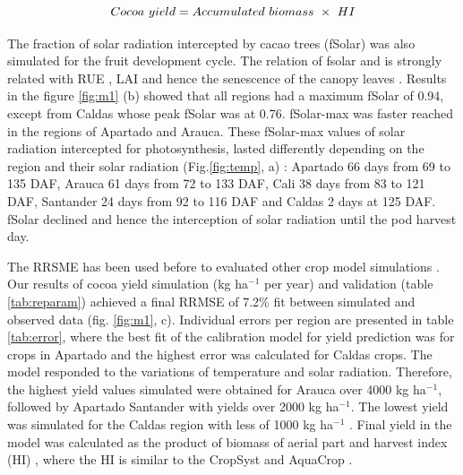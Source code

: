 \documentclass[gene,journal,article,submit,moreauthors,pdftex]{Definitions/mdpi}
\begin{document}
\begin{equation}
Cocoa~yield = Accumulated~ biomass~\times~ HI \\
\label{equ:HI}
\end{equation}


The fraction of solar radiation intercepted by cacao trees (fSolar) was also simulated for the fruit development cycle. The relation of fsolar and is strongly related with RUE \citep{Fletcher2013RUE,Bonhomme2000}, LAI and hence the senescence of the canopy leaves \citep{lahive2019, Danner2015, Soltani2012, Romero2017, Vina2011, Zao2019simple}. Results in the figure \ref{fig:m1} (b) showed that all regions had a maximum fSolar of 0.94, except from Caldas whose peak fSolar was at 0.76.  fSolar-max was faster reached in the regions of Apartado and Arauca. These fSolar-max values of solar radiation intercepted for photosynthesis, lasted differently depending on the region and their solar radiation (Fig.\ref{fig:temp}, a) : Apartado 66 days  from  69 to 135 DAF,  Arauca 61 days from 72 to 133 DAF, Cali 38 days from 83 to 121 DAF,  Santander 24 days from 92 to 116 DAF and Caldas 2 days at 125 DAF. fSolar declined and hence the interception of solar radiation until the pod harvest day. 

The RRSME has been used before to evaluated other crop model simulations \citep{Zao2019simple, Bai2020}. Our results of cocoa yield simulation (kg ha$^{-1}$ per year) and validation (table \ref{tab:reparam}) achieved a final RRMSE of 7.2\%  fit between simulated and observed data (fig. \ref{fig:m1}, c).  Individual errors per region are presented in table \ref{tab:error}, where the best fit of the calibration model for yield prediction  was for crops in  Apartado and the highest error was calculated for Caldas crops.  The model responded to the variations of temperature and solar radiation. Therefore, the highest  yield values simulated were obtained for Arauca over 4000 kg ha$^{-1}$, followed by Apartado Santander with yields over 2000 kg ha$^{-1}$.  The lowest yield was simulated for the Caldas region with less of 1000 kg ha$^{-1}$ . Final yield in the model was calculated as the product of biomass of aerial part and harvest index (HI) \citep{Zao2019simple, Amir1991}, where the HI is similar to the CropSyst \citep{STOCKLE2003} and AquaCrop \cite{Steduto2009}. 
\end{document}
